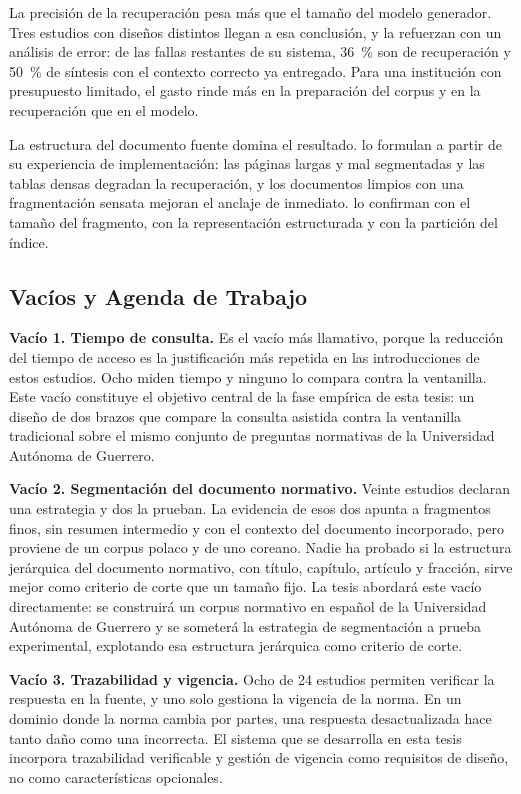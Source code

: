 \documentclass[man,12pt,floatsintext,donotrepeattitle]{apa7}
\begin{document}
La precisión de la recuperación pesa más que el tamaño del modelo generador. Tres estudios con diseños distintos llegan a esa conclusión, y \textcite{jayakody2026} la refuerzan con un análisis de error: de las fallas restantes de su sistema, 36~\% son de recuperación y 50~\% de síntesis con el contexto correcto ya entregado. Para una institución con presupuesto limitado, el gasto rinde más en la preparación del corpus y en la recuperación que en el modelo.

La estructura del documento fuente domina el resultado. \textcite{ramli2025} lo formulan a partir de su experiencia de implementación: las páginas largas y mal segmentadas y las tablas densas degradan la recuperación, y los documentos limpios con una fragmentación sensata mejoran el anclaje de inmediato. \textcite{wojtasik2025} lo confirman con el tamaño del fragmento, \textcite{zhong2025} con la representación estructurada y \textcite{vurukonda2026} con la partición del índice.

\subsection{Vacíos y Agenda de Trabajo}
\textbf{Vacío 1. Tiempo de consulta.} Es el vacío más llamativo, porque la reducción del tiempo de acceso es la justificación más repetida en las introducciones de estos estudios. Ocho miden tiempo y ninguno lo compara contra la ventanilla. Este vacío constituye el objetivo central de la fase empírica de esta tesis: un diseño de dos brazos que compare la consulta asistida contra la ventanilla tradicional sobre el mismo conjunto de preguntas normativas de la Universidad Autónoma de Guerrero.

\textbf{Vacío 2. Segmentación del documento normativo.} Veinte estudios declaran una estrategia y dos la prueban. La evidencia de esos dos apunta a fragmentos finos, sin resumen intermedio y con el contexto del documento incorporado, pero proviene de un corpus polaco y de uno coreano. Nadie ha probado si la estructura jerárquica del documento normativo, con título, capítulo, artículo y fracción, sirve mejor como criterio de corte que un tamaño fijo. La tesis abordará este vacío directamente: se construirá un corpus normativo en español de la Universidad Autónoma de Guerrero y se someterá la estrategia de segmentación a prueba experimental, explotando esa estructura jerárquica como criterio de corte.

\textbf{Vacío 3. Trazabilidad y vigencia.} Ocho de 24 estudios permiten verificar la respuesta en la fuente, y uno solo gestiona la vigencia de la norma. En un dominio donde la norma cambia por partes, una respuesta desactualizada hace tanto daño como una incorrecta. El sistema que se desarrolla en esta tesis incorpora trazabilidad verificable y gestión de vigencia como requisitos de diseño, no como características opcionales.
\end{document}
